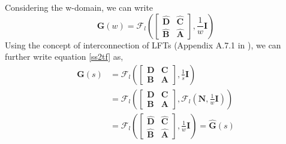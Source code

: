 Considering the w-domain, we can write $$\bm{G}(w) = \mathcal{F}_l\left(\begin{bmatrix}
        \hat{\bm{D}} & \hat{\bm{C}} \\
        \hat{\bm{B}} & \hat{\bm{A}}
    \end{bmatrix},\frac{1}{w}\bm{I}\right)$$
Using the concept of interconnection of LFTs (Appendix A.7.1 in \cite{Sko05}), we can further write equation \eqref{ss2tf} as,
\begin{align*}
    \bm{G}(s) &= \mathcal{F}_l\left(\begin{bmatrix}
        \bm{D} & \bm{C} \\
        \bm{B} & \bm{A}
    \end{bmatrix},\frac{1}{s}\bm{I}\right)\\
    &= \mathcal{F}_l\left(\begin{bmatrix}
        \bm{D} & \bm{C} \\
        \bm{B} & \bm{A}
    \end{bmatrix},\mathcal{F}_l\left(\bm{N},\frac{1}{w}\bm{I}\right)\right)\\
    &= \mathcal{F}_l\left(\begin{bmatrix}
        \hat{\bm{D}} & \hat{\bm{C}} \\
        \hat{\bm{B}} & \hat{\bm{A}}
    \end{bmatrix},\frac{1}{w}\bm{I}\right) = \hat{\bm{G}}(s)
\end{align*}

